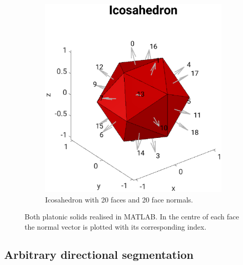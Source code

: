 \begin{figure}[H]
\begin{subfigure}[b]{0.47\textwidth}
         \includegraphics[width=1.2\textwidth]{Graphics/Icosahedron.eps}
         \caption{Icosahedron with 20 faces and 20 face normals.}
         \label{fig:Icosahedron_MATLAB}
     \end{subfigure}
        \caption{Both platonic solids realised in MATLAB. In the centre of each face the normal vector is plotted with its corresponding index. }
        \label{fig:platonic_solids_matlab}
\end{figure}


\subsection{Arbitrary directional segmentation}
\label{chap:arbitrarySegment}

